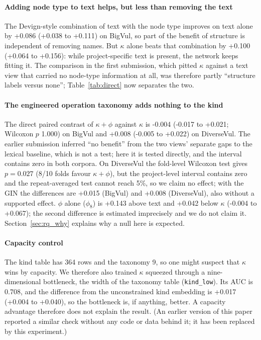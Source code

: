 \documentclass[pdflatex,sn-basic]{sn-jnl}
\theoremstyle{thmstyleone}%
\newcommand{\cBvGgnnKindLowVKindD}{+0.017}
\newcommand{\cBvGgnnKindLowVKindHi}{+0.040}
\newcommand{\cBvGgnnKindLowVKindLo}{+0.004}
\newcommand{\cBvGgnnKindVLexKindD}{+0.100}
\newcommand{\cBvGgnnKindVLexKindHi}{+0.156}
\newcommand{\cBvGgnnKindVLexKindLo}{+0.064}
\newcommand{\cBvGgnnKindVOpD}{+0.042}
\newcommand{\cBvGgnnKindVOpHi}{+0.067}
\newcommand{\cBvGgnnKindVOpLo}{-0.004}
\newcommand{\cBvGgnnLexKindVLexD}{+0.086}
\newcommand{\cBvGgnnLexKindVLexHi}{+0.111}
\newcommand{\cBvGgnnLexKindVLexLo}{+0.038}
\newcommand{\cBvGgnnOpKindVKindD}{-0.004}
\newcommand{\cBvGgnnOpKindVKindHi}{+0.021}
\newcommand{\cBvGgnnOpKindVKindLo}{-0.017}
\newcommand{\cBvGgnnOpKindVKindW}{1.000}
\newcommand{\cBvGgnnOpVLexD}{+0.143}
\newcommand{\cBvGinOpKindVKindD}{+0.015}
\newcommand{\cDvGgnnOpKindVKindD}{+0.008}
\newcommand{\cDvGgnnOpKindVKindHi}{+0.022}
\newcommand{\cDvGgnnOpKindVKindLo}{-0.005}
\newcommand{\cDvGgnnOpKindVKindW}{0.027}
\newcommand{\cDvGgnnOpKindVKindWins}{8/10}
\newcommand{\cDvGinOpKindVKindD}{+0.008}
\newcommand{\mBvGgnnKindLowAuc}{0.708}
\begin{document}
\paragraph{Adding node type to text helps, but less than removing the text}
The Devign-style combination of text with the node type improves on text alone
by \cBvGgnnLexKindVLexD{} (\cBvGgnnLexKindVLexLo{} to
\cBvGgnnLexKindVLexHi{}) on BigVul, so part of the benefit of structure is
independent of removing names. But $\kappa$ alone beats that combination by
\cBvGgnnKindVLexKindD{} (\cBvGgnnKindVLexKindLo{} to
\cBvGgnnKindVLexKindHi{}): while project-specific text is present, the network
keeps fitting it. The comparison in the first submission, which pitted
$\kappa$ against a text view that carried no node-type information at all, was
therefore partly ``structure labels versus none''; Table~\ref{tab:direct} now
separates the two.

\paragraph{The engineered operation taxonomy adds nothing to the kind}
The direct paired contrast of $\kappa{+}\phi$ against $\kappa$ is
\cBvGgnnOpKindVKindD{} (\cBvGgnnOpKindVKindLo{} to \cBvGgnnOpKindVKindHi{};
Wilcoxon $p$ \cBvGgnnOpKindVKindW{}) on BigVul and \cDvGgnnOpKindVKindD{}
(\cDvGgnnOpKindVKindLo{} to \cDvGgnnOpKindVKindHi{}) on DiverseVul. The
earlier submission inferred ``no benefit'' from the two views' separate gaps
to the lexical baseline, which is not a test; here it is tested directly, and
the interval contains zero in both corpora. On DiverseVul the fold-level
Wilcoxon test gives $p=\cDvGgnnOpKindVKindW{}$ (\cDvGgnnOpKindVKindWins{} folds
favour $\kappa{+}\phi$), but the project-level interval contains zero and the
repeat-averaged test cannot reach 5\%, so we claim no effect; with the GIN the
differences are \cBvGinOpKindVKindD{} (BigVul) and \cDvGinOpKindVKindD{}
(DiverseVul), also without a supported effect. $\phi$ alone ($\phi_8$) is
\cBvGgnnOpVLexD{} above text and \cBvGgnnKindVOpD{} below $\kappa$
(\cBvGgnnKindVOpLo{} to \cBvGgnnKindVOpHi{}); the second difference is
estimated imprecisely and we do not claim it. Section~\ref{sec:rq_why}
explains why a null here is expected.

\paragraph{Capacity control} The kind table has 364 rows and the taxonomy 9, so
one might suspect that $\kappa$ wins by capacity. We therefore also trained
$\kappa$ squeezed through a nine-dimensional bottleneck, the width of the
taxonomy table (\texttt{kind\_low}). Its AUC is \mBvGgnnKindLowAuc{}, and the
difference from the unconstrained kind embedding is \cBvGgnnKindLowVKindD{}
(\cBvGgnnKindLowVKindLo{} to \cBvGgnnKindLowVKindHi{}), so the bottleneck is,
if anything, better. A capacity advantage therefore does not explain the
result. (An earlier version of this paper reported a similar check without any
code or data behind it; it has been replaced by this experiment.)
\end{document}
